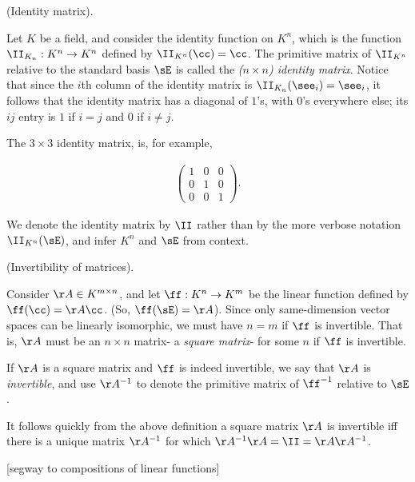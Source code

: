 \begin{defn}
    (Identity matrix).
    
    Let $K$ be a field, and consider the identity function on $K^n$, which is the function $\II_{K_n}:K^n \rightarrow K^n$ defined by $\II_{K^n}(\cc) = \cc$. The primitive matrix of $\II_{K^n}$ relative to the standard basis $\sE$ is called the \textit{($n \times n$) identity matrix}. Notice that since the $i$th column of the identity matrix is $\II_{K_n}(\see_i) = \see_i$, it follows that the identity matrix has a diagonal of $1$'s, with $0$'s everywhere else; its $ij$ entry is $1$ if $i = j$ and $0$ if $i \neq j$. 
    
    The $3 \times 3$ identity matrix, is, for example,
    
    \begin{align*}
        \begin{pmatrix}
            1 & 0 & 0 \\
            0 & 1 & 0 \\
            0 & 0 & 1
        \end{pmatrix}.
    \end{align*}
    
    We denote the identity matrix by $\II$ rather than by the more verbose notation $\II_{K^n}(\sE)$, and infer $K^n$ and $\sE$ from context.
\end{defn}

\begin{defn}
    (Invertibility of matrices).
    
    Consider $\AA \in K^{m \times n}$, and let $\ff:K^n \rightarrow K^m$ be the linear function defined by $\ff(\cc) = \AA \cc$. (So, $\ff(\sE) = \AA$). Since only same-dimension vector spaces can be linearly isomorphic, we must have $n = m$ if $\ff$ is invertible. That is, $\AA$ must be an $n \times n$ matrix- a \textit{square matrix}- for some $n$ if $\ff$ is invertible.
    
    If $\AA$ is a square matrix and $\ff$ is indeed invertible, we say that $\AA$ is \textit{invertible}, and use $\AA^{-1}$ to denote the primitive matrix of $\ff^{-1}$ relative to $\sE$.
    
    It follows quickly from the above definition a square matrix $\AA$ is invertible iff there is a unique matrix $\AA^{-1}$ for which ${\AA^{-1} \AA = \II = \AA \AA^{-1}}$.
\end{defn}

[segway to compositions of linear functions]

